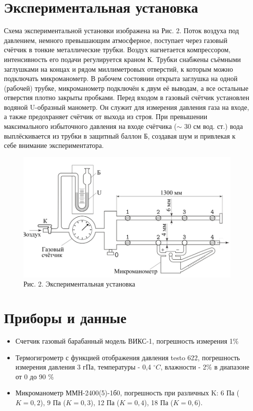 \documentclass[a4paper]{article}
\begin{document}
\section{Экспериментальная установка}
Схема экспериментальной установки изображена на Рис. 2. Поток воздуха
под давлением, немного превышающим атмосферное, поступает через газовый счётчик в тонкие металлические трубки. Воздух нагнетается компрессором, интенсивность его подачи регулируется краном К. Трубки снабжены
съёмными заглушками на концах и рядом миллиметровых отверстий, к которым можно подключать микроманометр. В рабочем состоянии открыта заглушка на одной (рабочей) трубке, микроманометр подключён к двум её выводам, а все остальные отверстия плотно закрыты пробками.
Перед входом в газовый счётчик установлен водяной U-образный манометр. Он служит для измерения давления газа на входе, а также предохраняет
счётчик от выхода из строя. При превышении максимального избыточного
давления на входе счётчика ($\sim$ 30 см вод. ст.) вода выплёскивается из трубки
в защитный баллон Б, создавая шум и привлекая к себе внимание экспериментатора.
\begin{figure}[h!]
        \centering
        \includegraphics[scale=0.5]{Pictures/Ustanovka.png}
        \caption{
        Рис. 2. Экспериментальная установка
        }
 \end{figure} 

\section{Приборы и данные}
\begin{itemize}
    \item Счетчик газовый барабанный модель ВИКС-1, погрешность измерения 1\%
    \item Термогигрометр с функцией отображения давления testo 622, погрешность измерения давления 3 гПа, температуры - 0,4 $^\circ C$, влажности - 2\% в диапазоне от 0 до 90 \%
    \item Микроманометр ММН-2400(5)-1б0, погрешность при различных K: 6 Па ($K = 0,2$), 9 Па ($K = 0,3$), 12 Па ($K = 0,4$), 18 Па ($K = 0,6$).
\end{itemize}
\end{document}
